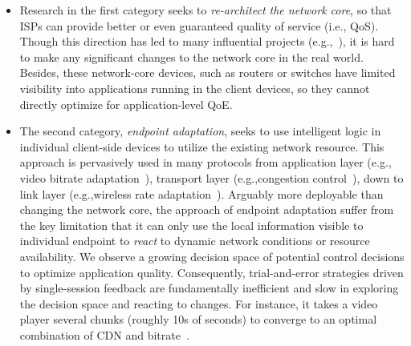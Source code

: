 \begin{itemize}
\item Research in the first category seeks to {\em re-architect the network core}, 
so that ISPs can provide
better or even guaranteed quality of service (i.e., QoS). 
Though this direction has led to many influential projects 
(e.g.,~\cite{demers1989analysis,stoica1998core,tennenhouse2002towards}),
it is hard to make any significant changes to the network core in the real world. 
Besides, these network-core devices, such as routers or switches have 
limited visibility into applications running in the client devices, so they cannot
directly optimize for application-level QoE.

\item The second category, {\em endpoint adaptation}, seeks to use
intelligent logic in individual client-side devices to  utilize the existing 
network resource.
This approach is pervasively used in many protocols from 
application layer (e.g., video bitrate adaptation~\cite{dash}),
transport layer (e.g.,congestion control~\cite{jacobson1988congestion}),
down to link layer (e.g.,wireless rate adaptation~\cite{holland2001rate}).
Arguably more deployable than changing the network core, the approach 
of endpoint adaptation suffer from the key limitation that
it can only use the local information visible to individual endpoint to
{\em react} to dynamic network conditions or resource availability.
We observe a growing decision space of potential control decisions 
to optimize application quality.
Consequently, trial-and-error strategies driven by single-session feedback are
fundamentally inefficient and slow in exploring the decision space and reacting to
changes. For instance, it takes a video player several chunks (roughly 10s of
seconds) to converge to an optimal combination of CDN and bitrate~\cite{dda-report}.

\end{itemize}


